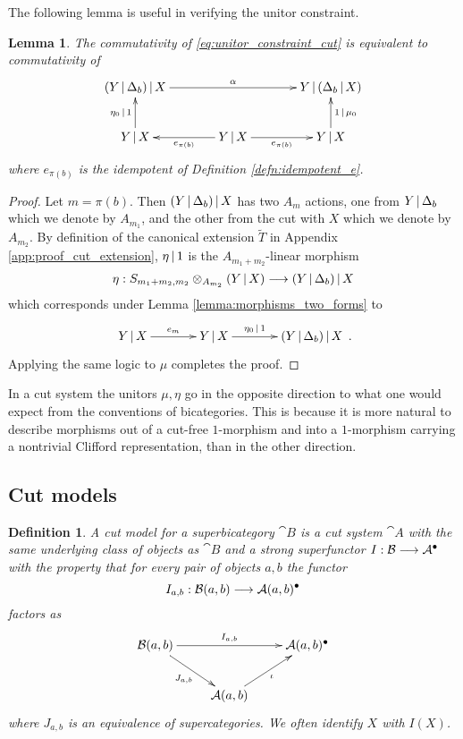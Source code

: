 \documentclass[english,letter paper,12pt,leqno]{article}
\newtheorem{lemma}[theorem]{Lemma}
\theoremstyle{example}
\newtheorem{definition}[theorem]{Definition}
\numberwithin{equation}{section}
\begin{document}
The following lemma is useful in verifying the unitor constraint.

\begin{lemma}\label{lemma:unitor_check_help} The commutativity of \eqref{eq:unitor_constraint_cut} is equivalent to commutativity of
\begin{equation}\label{eq:unitor_check_help1}
\xymatrix@C+1pc{
(Y \l \Delta_b) \l X \ar[rr]^-{\alpha} & & Y \l ( \Delta_b \l X )\\
Y \l X \ar[u]^-{\eta_0 \l 1} & Y \l X \ar[l]^-{e_{\pi(b)}} \ar[r]_-{e_{\pi(b)}} & Y \l X \ar[u]_-{1 \l \mu_0}
}
\end{equation}
where $e_{\pi(b)}$ is the idempotent of Definition \ref{defn:idempotent_e}.
\end{lemma}
\begin{proof}
Let $m = \pi(b)$. Then $(Y \,|\, \Delta_b) \,|\, X$ has two $A_m$ actions, one from $Y \,|\, \Delta_b$ which we denote by $A_{m_1}$, and the other from the cut with $X$ which we denote by $A_{m_2}$. By definition of the canonical extension $\widetilde{T}$ in Appendix \ref{app:proof_cut_extension}, $\eta \,|\, 1$ is the $A_{m_1+m_2}$-linear morphism
\[
\eta: S_{m_1 + m_2, m_2} \otimes_{A_{m_2}} ( Y \,|\, X ) \longrightarrow (Y \,|\, \Delta_b ) \,|\, X
\]
which corresponds under Lemma \ref{lemma:morphisms_two_forms} to
\[
\xymatrix@C+1pc{
Y \l X \ar[r]^-{e_m} & Y \l X \ar[r]^-{\eta_0 \l 1} & (Y \l \Delta_b) \l X
}\,.
\]
Applying the same logic to $\mu$ completes the proof.
\end{proof}

In a cut system the unitors $\mu, \eta$ go in the opposite direction to what one would expect from the conventions of bicategories. This is because it is more natural to describe morphisms out of a cut-free $1$-morphism and into a $1$-morphism carrying a nontrivial Clifford representation, than in the other direction.

\subsection{Cut models}\label{section:cut_models}

\begin{definition} A \emph{cut model} for a superbicategory $\cat{B}$ is a cut system $\cat{A}$ with the same underlying class of objects as $\cat{B}$ and a strong superfunctor $I: \mathcal{B} \longrightarrow \mathcal{A}^\bullet$ with the property that for every pair of objects $a,b$ the functor
\[
I_{a,b}: \mathcal{B}(a,b) \longrightarrow \mathcal{A}(a,b)^\bullet
\]
factors as
\[
\xymatrix{
\cat{B}(a,b) \ar[rr]^-{I_{a,b}} \ar[dr]_-{J_{a,b}} & & \cat{A}(a,b)^\bullet\\
& \cat{A}(a,b) \ar[ur]_-{\iota}
}
\]
where $J_{a,b}$ is an equivalence of supercategories. We often identify $X$ with $I(X)$.
\end{definition}
\end{document}
